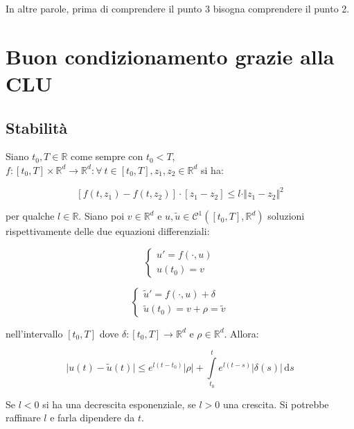 \documentclass[hidelinks, 10pt]{report}
\begin{document}
In altre parole, prima di comprendere il punto 3 bisogna comprendere il punto 2.

\section{Buon condizionamento grazie alla CLU}

\subsection{Stabilit\`a}
Siano $ t_{0}, T \in \mathbb{R} $ come sempre con $ t_{0} < T $, $ f: [t_{0}, T] \times \mathbb{R}^{d} \to \mathbb{R}^{d} : \forall\ t \in [t_{0}, T], z_{1}, z_{2} \in \mathbb{R}^{d} $ si ha:

\[
[ f(t, z_{1}) - f(t, z_{2}) ] \cdot [z_{1} - z_{2}] \leq l \cdot \Vert z_{1} - z_{2} \Vert^{2}
\]

per qualche $ l \in \mathbb{R} $. Siano poi $ v \in \mathbb{R}^{d} $ e $ u, \tilde{u} \in \mathcal{C}^{1}([t_{0}, T], \mathbb{R}^{d}) $ soluzioni rispettivamente delle due equazioni differenziali:

\[
\begin{cases}
u' = f(\cdot, u) \\
u(t_{0}) = v
\end{cases}
\]

\[\begin{cases}
\tilde{u}' = f(\cdot, u) + \delta \\
\tilde{u}(t_{0}) = v + \rho = \tilde{v}
\end{cases}
\]

nell'intervallo $ [t_{0}, T] $ dove $ \delta: [t_{0}, T] \to \mathbb{R}^{d} $ e $ \rho \in \mathbb{R}^{d} $. Allora:
 
\[
\vert u(t) - \tilde{u}(t) \vert \leq e^{l(t - t_{0})} \vert \rho \vert + \int\limits_{t_{0}}^{t} e^{l(t - s)} \vert \delta(s) \vert \, \mathrm{d}s \]

Se $ l < 0 $ si ha una decrescita esponenziale, se $ l > 0 $ una crescita. Si potrebbe raffinare $ l $ e farla dipendere da $ t $.
\end{document}
